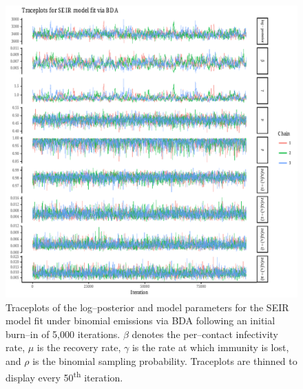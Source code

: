 \begin{figure}[htbp]
	\centering
	\includegraphics[width=\linewidth]{figures/bbs_seir_bda_traceplots.pdf}
	\caption[Traceplots for SEIR model parameters fit to the boarding school data using Bayesian data augmentation.]{Traceplots of the log--posterior and model parameters for the SEIR model fit under binomial emissions via BDA following an initial burn--in of 5,000 iterations. $ \beta $ denotes the per--contact infectivity rate, $ \mu $ is the recovery rate, $ \gamma $ is the rate at which immunity is lost, and $ \rho $ is the binomial sampling probability. Traceplots are thinned to display every 50\textsuperscript{th} iteration.}
	\label{fig:bbs_seir_bda_traceplots}
\end{figure}

